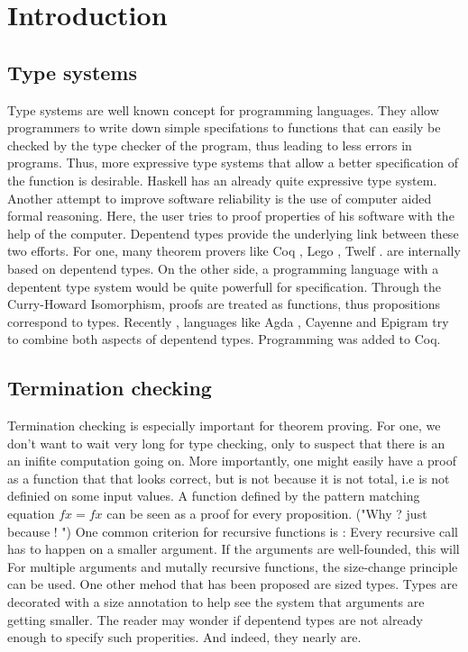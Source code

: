 \chapter{Introduction}
\section {Type systems}
Type systems are well known concept for programming languages.
They allow programmers to write down simple specifations to functions that can easily be checked by the type checker of the program, thus leading to less errors in programs.
Thus, more expressive type systems that allow a better specification of the function is desirable.
Haskell \cite{haskell} has an already quite expressive type system.
Another attempt to improve software reliability is the use of computer aided formal reasoning.
Here, the user tries to proof properties of his software with the help of the computer.
Depentend types provide the underlying link between these two efforts.
For one, many theorem provers like Coq \cite{coq} , Lego \cite{pollack94theory} , Twelf \cite{pfenning99system}.
are internally based on depentend types.
On the other side, a programming language with a depentent type system would be quite powerfull for specification.
Through the Curry-Howard Isomorphism, proofs are treated as functions, thus propositions correspond to types.
Recently , languages like Agda \cite{norell:thesis}, Cayenne \cite{augustsson98cayenne} and Epigram \cite{epigram} try to combine both aspects of depentend types.
Programming was added to Coq.

\section {Termination checking}
Termination checking is especially important for theorem proving.
For one, we don't want to wait very long for type checking, only to suspect that there is an
an inifite computation going on.
More importantly, one might easily have a proof as a function that that looks correct, but is not because it is not total, i.e is not definied on some input values.
A function defined by the pattern matching equation $ f x = f x $ can be seen as a proof for every proposition.
("Why ? just because ! ")
One common criterion for recursive functions is : Every recursive call has to happen on a smaller argument.
If the arguments are well-founded, this will 
For multiple arguments and mutally recursive functions, the size-change principle can be used.
One other mehod that has been proposed are sized types.
Types are decorated with a size annotation to help see the system that arguments are getting smaller.
The reader may wonder if depentend types are not already enough to specify such properities.
And indeed, they nearly are.

